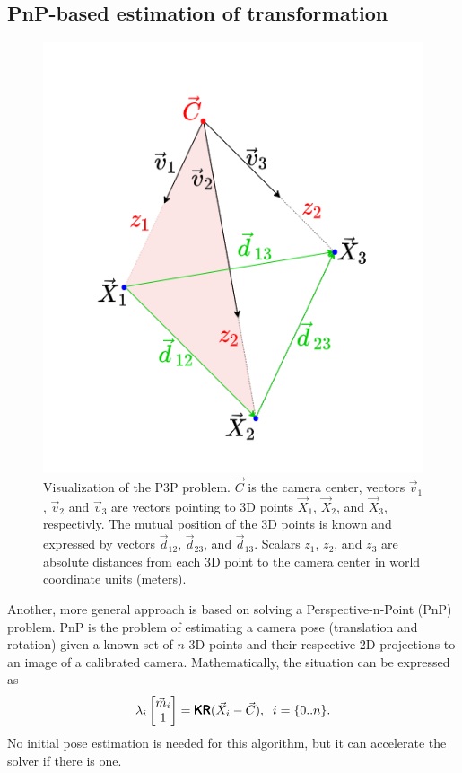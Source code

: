 \subsection{PnP-based estimation of transformation}
\label{sec:pnp}
\begin{figure}[h]
    \centering
    \includegraphics[width=.4\textwidth]{graphics/p3p.png}
    \caption[Visualization of the P3P problem.]{Visualization of the P3P problem. $\vec{C}$ is the camera center, vectors $\vec{v}_1$, $\vec{v}_2$ and $\vec{v}_3$ are vectors pointing to 3D points $\vec{X}_1$, $\vec{X}_2$, and $\vec{X}_3$, respectivly. The mutual position of the 3D points is known and expressed by vectors $\vec{d}_{12}$, $\vec{d}_{23}$, and $\vec{d}_{13}$. Scalars $z_1$, $z_2$, and $z_3$ are absolute distances from each 3D point to the camera center in world coordinate units (meters).}
    \label{fig:p3p}
\end{figure}

Another, more general approach is based on solving a Perspective-n-Point (PnP) problem.
PnP is the problem of estimating a camera pose (translation and rotation) given a known set of $n$ 3D points and their respective 2D projections to an image of a calibrated camera.
Mathematically, the situation can be expressed as
\begin{equation}
    \label{eq:pnp_intro}
    \lambda_i \begin{bmatrix} \vec{m}_i \\ 1 \end{bmatrix} = \pmb{\mathsf{K}} \pmb{\mathsf{R}} (\vec{X}_i - \vec{C}), \;\; i = \{0..n\}.
\end{equation}
No initial pose estimation is needed for this algorithm, but it can accelerate the solver if there is one.

